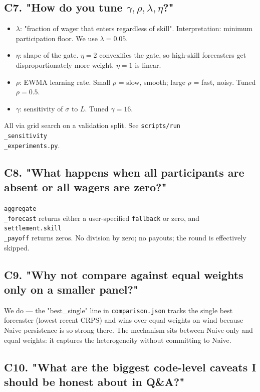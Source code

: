 \documentclass[11pt]{article}
\begin{document}
\subsection{C7. "How do you tune $\gamma, \rho, \lambda, \eta$?"}


\begin{itemize}
\item $\lambda$: "fraction of wager that enters regardless of skill". Interpretation: minimum participation floor. We use $\lambda = 0.05$.
\item $\eta$: shape of the gate. $\eta = 2$ convexifies the gate, so high-skill forecasters get disproportionately more weight. $\eta = 1$ is linear.
\item $\rho$: EWMA learning rate. Small $\rho$ = slow, smooth; large $\rho$ = fast, noisy. Tuned $\rho = 0.5$.
\item $\gamma$: sensitivity of $\sigma$ to $L$. Tuned $\gamma = 16$.
\end{itemize}

All via grid search on a validation split. See \texttt{scripts/run\\_sensitivity\\_experiments.py}.

\subsection{C8. "What happens when all participants are absent or all wagers are zero?"}


\texttt{aggregate\\_forecast} returns either a user-specified \texttt{fallback} or zero, and \texttt{settlement.skill\\_payoff} returns zeros. No division by zero; no payouts; the round is effectively skipped.

\subsection{C9. "Why not compare against equal weights only on a smaller panel?"}


We do --- the "best\_single" line in \texttt{comparison.json} tracks the single best forecaster (lowest recent CRPS) and wins over equal weights on wind because Naive persistence is so strong there. The mechanism sits between Naive-only and equal weights: it captures the heterogeneity without committing to Naive.

\subsection{C10. "What are the biggest code-level caveats I should be honest about in Q\&A?"}
\end{document}

